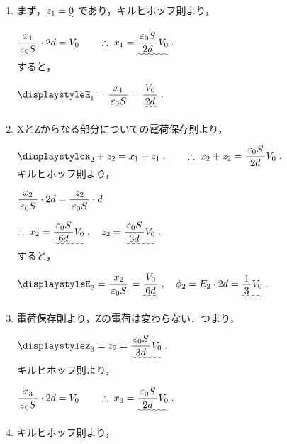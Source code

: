 \documentclass[../../../uem_phy_std_a.tex]{subfiles}
\begin{document}
    \begin{enumerate}
        \item まず，$z_1 = \uwave{0}$ であり，キルヒホッフ則より，
            
            \myspaceb%
            $\displaystyle%
                \myfracc{x_1}{\varepsilon_0 S} \cdot 2d = V_0%
                \qquad \therefore \; x_1%
                = \uwave{\myfracc{\varepsilon_0 S}{2d} V_0} \;.
            $\\
            すると，
            
            \myspaceb%
            $\displaystyle%
                E_1 = \myfracc{x_1}{\varepsilon_0 S}%
                = \uwave{\myfracc{V_0}{2d}} \;.
            $            
        \item XとZからなる部分についての電荷保存則より，
            
            \myspaceb%
            $\displaystyle%
                x_2 + z_2 = x_1 + z_1 \;.%
                \qquad \therefore \; x_2 + z_2 =%
                \myfracc{\varepsilon_0 S}{2d} V_0 \;.
            $\\
            キルヒホッフ則より，
            
            \myspaceb%
            $\displaystyle%
                \myfracc{x_2}{\varepsilon_0 S} \cdot 2d%
                = \myfracc{z_2}{\varepsilon_0 S} \cdot d
            $

            \myspaceb%
            $\displaystyle%
                \therefore \; x_2%
                =\uwave{\myfracc{\varepsilon_0 S}{6d} V_0} \;,%
                \quad z_2 = \uwave{\myfracc{\varepsilon_0 S}{3d} V_0} \;.
            $\\
            すると，
            
            \myspaceb%
            $\displaystyle%
                E_2 = \myfracc{x_2}{\varepsilon_0 S}%
                = \uwave{\myfracc{V_0}{6d}} \;,  %
                \quad \phi_2 = E_2 \cdot 2d = \uwave{\myfraca{1}{3} V_0} \;.
            $
        \item 電荷保存則より，Zの電荷は変わらない．つまり，
            
            \myspaceb%
            $\displaystyle%
                z_3 = z_2 = \uwave{\myfracc{\varepsilon_0 S}{3d} V_0} \;.
            $\\
            キルヒホッフ則より，
            
            \myspaceb%
            $\displaystyle%
                \myfracc{x_3}{\varepsilon_0 S} \cdot 2d = V_0%
                \qquad \therefore \; x_3%
                = \uwave{\myfracc{\varepsilon_0 S}{2d} V_0} \;.
            $
        \item キルヒホッフ則より，
            

\end{enumerate}
\end{document}
